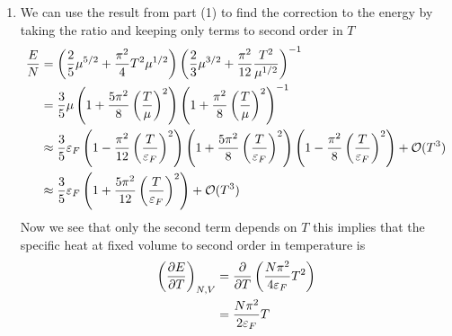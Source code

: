 \documentclass[11pt]{article}
\numberwithin{equation}{section}
\begin{document}
\begin{enumerate}[(1)]
\item We can use the result from part (1) to find the correction to the energy by taking the
ratio and keeping only terms to second order in $T$
\begin{align*}
\frac{E}{N} &= \left(\frac{2}{5}\mu^{5/2}+\frac{\pi^2}{4}T^2\mu^{1/2}\right)\left(\frac{2}{3}\mu^{3/2}+\frac{\pi^2}{12}\frac{T^2}{\mu^{1/2}}\right)^{-1}\\
&= \frac{3}{5}\mu\left(1+\frac{5\pi^2}{8}\left(\frac{T}{\mu}\right)^2\right)\left(1+\frac{\pi^2}{8}\left(\frac{T}{\mu}\right)^2\right)^{-1}\\
&\approx \frac{3}{5}\varepsilon_F\left(1 - \frac{\pi^2}{12}\left(\frac{T}{\varepsilon_F}\right)^2\right)\left(1+\frac{5\pi^2}{8}\left(\frac{T}{\varepsilon_F}\right)^2\right)\left(1-\frac{\pi^2}{8}\left(\frac{T}{\varepsilon_F}\right)^2\right) + \mathcal{O}(T^3)\\
&\approx \frac{3}{5}\varepsilon_F\left(1 + \frac{5\pi^2}{12}\left(\frac{T}{\varepsilon_F}\right)^2\right) + \mathcal{O}(T^3)
\end{align*}
Now we see that only the second term depends on $T$ this implies that the specific heat at 
fixed volume to second order in temperature is 
\begin{align*}
\left(\frac{\partial{E}}{\partial{T}}\right)_{N,V} &= \frac{\partial{}}{\partial{T}}\left(\frac{N\pi^2}{4\varepsilon_F}T^2\right) \\
&= \frac{N\pi^2}{2\varepsilon_F}T
\end{align*}


\end{enumerate}
\end{document}
